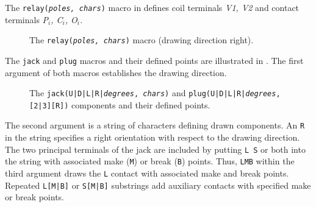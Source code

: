 The {\tt relay({\sl poles, chars})} macro in 
defines coil terminals {\sl V1, V2} and contact
terminals {\sl P$_i$, C$_i$, O$_i$.} 
\begin{figure}[h!t]
   
   \vspace{-1ex}
   \caption{The {\tt relay({\sl poles, chars})}
     macro (drawing direction right).}
   \label{Relay}
   \end{figure}

The {\tt jack} and {\tt plug} macros and their defined points are
 illustrated in .
 The first argument of both macros establishes the drawing direction.
\begin{figure}[h!t]
   
   \vspace{-1ex}
   \caption{The {\tt jack(U|D|L|R|{\sl degrees}, {\sl chars})}
 and {\tt plug(U|D|L|R|{\sl degrees},[2|3][R])} components
 and their defined points.}
   \label{Jack}
   \end{figure}
 The second argument is a string of characters defining drawn components.
 An {\tt R} in the string specifies a
 right orientation with respect to the drawing direction.
 The two principal terminals of
 the jack are included by putting \hbox{{\tt L} {\tt S}}
 or both into the string with associated make ({\tt M})
 or break ({\tt B}) points.  Thus, {\tt LMB} within the third
 argument draws the {\tt L} contact with
 associated make and break points. Repeated {\tt L[M|B]}
 or {\tt S[M|B]} substrings add auxiliary contacts with 
 specified make or break points.

